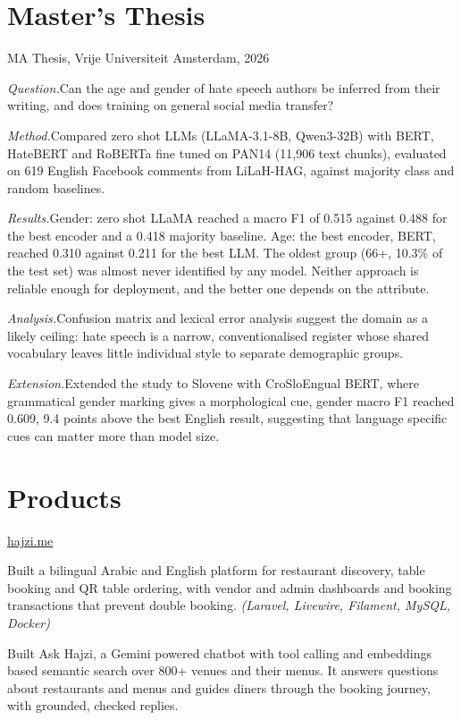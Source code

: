 \documentclass[10pt]{article}
\newcommand{\product}[2]{\Needspace{4\baselineskip}\vspace{2pt}{\bfseries #1}\hfill{\footnotesize #2}\par\vspace{-1pt}}
\newcommand{\live}[2]{\href{https://#1}{\color{link}#2}}
\newcommand{\bl}[1]{\textit{#1.}\;}
\begin{document}
\section*{Master's Thesis}
\product{Author Profiling of Hate Speech Spreaders}{\color{gray}MA Thesis, Vrije Universiteit Amsterdam, 2026}
\begin{tights}
  \item \bl{Question}Can the age and gender of hate speech authors be inferred from their writing, and does training on general social media transfer?
  \item \bl{Method}Compared zero shot LLMs (LLaMA-3.1-8B, Qwen3-32B) with BERT, HateBERT and RoBERTa fine tuned on PAN14 (11,906 text chunks), evaluated on 619 English Facebook comments from LiLaH-HAG, against majority class and random baselines.
  \item \bl{Results}Gender: zero shot LLaMA reached a macro F1 of 0.515 against 0.488 for the best encoder and a 0.418 majority baseline. Age: the best encoder, BERT, reached 0.310 against 0.211 for the best LLM. The oldest group (66+, 10.3\% of the test set) was almost never identified by any model. Neither approach is reliable enough for deployment, and the better one depends on the attribute.
  \item \bl{Analysis}Confusion matrix and lexical error analysis suggest the domain as a likely ceiling: hate speech is a narrow, conventionalised register whose shared vocabulary leaves little individual style to separate demographic groups.
  \item \bl{Extension}Extended the study to Slovene with CroSloEngual BERT, where grammatical gender marking gives a morphological cue, gender macro F1 reached 0.609, 9.4 points above the best English result, suggesting that language specific cues can matter more than model size.
\end{tights}

\section*{Products}

\product{Hajzi: Restaurant Booking Platform with an AI Dining Assistant}{\live{hajzi.me}{hajzi.me}}
\begin{tights}
  \item Built a bilingual Arabic and English platform for restaurant discovery, table booking and QR table ordering, with vendor and admin dashboards and booking transactions that prevent double booking. {\footnotesize\color{gray}\textit{(Laravel, Livewire, Filament, MySQL, Docker)}}
  \item Built Ask Hajzi, a Gemini powered chatbot with tool calling and embeddings based semantic search over 800+ venues and their menus. It answers questions about restaurants and menus and guides diners through the booking journey, with grounded, checked replies.
\end{tights}
\end{document}
